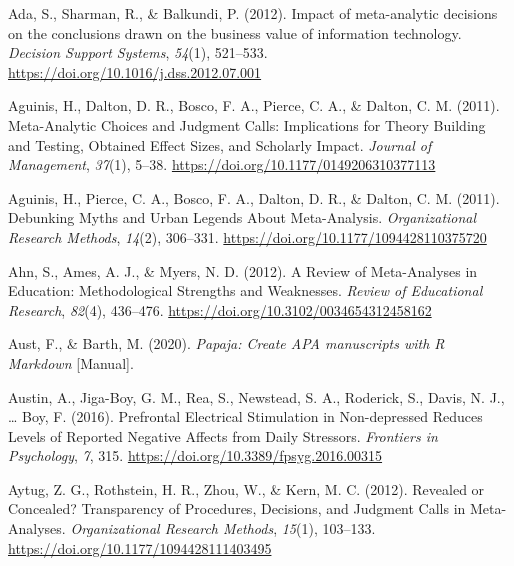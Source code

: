 \documentclass[
  man,floatsintext]{apa6}
\newlength{\cslhangindent}
\newlength{\cslentryspacingunit} %
\newenvironment{CSLReferences}[2] %
 {%
  \setlength{\parindent}{0pt}
  \ifodd #1
  \let\oldpar\par
  \def\par{\hangindent=\cslhangindent\oldpar}
  \fi
  \setlength{\parskip}{#2\cslentryspacingunit}
 }%
 {}
\begin{document}
\hypertarget{refs}{}
\begin{CSLReferences}{1}{0}
\leavevmode{}%
Ada, S., Sharman, R., \& Balkundi, P. (2012). Impact of meta-analytic decisions on the conclusions drawn on the business value of information technology. \emph{Decision Support Systems}, \emph{54}(1), 521--533. \url{https://doi.org/10.1016/j.dss.2012.07.001}

\leavevmode{}%
Aguinis, H., Dalton, D. R., Bosco, F. A., Pierce, C. A., \& Dalton, C. M. (2011). Meta-{Analytic Choices} and {Judgment Calls}: {Implications} for {Theory Building} and {Testing}, {Obtained Effect Sizes}, and {Scholarly Impact}. \emph{Journal of Management}, \emph{37}(1), 5--38. \url{https://doi.org/10.1177/0149206310377113}

\leavevmode{}%
Aguinis, H., Pierce, C. A., Bosco, F. A., Dalton, D. R., \& Dalton, C. M. (2011). Debunking {Myths} and {Urban Legends About Meta-Analysis}. \emph{Organizational Research Methods}, \emph{14}(2), 306--331. \url{https://doi.org/10.1177/1094428110375720}

\leavevmode{}%
Ahn, S., Ames, A. J., \& Myers, N. D. (2012). A {Review} of {Meta-Analyses} in {Education}: {Methodological Strengths} and {Weaknesses}. \emph{Review of Educational Research}, \emph{82}(4), 436--476. \url{https://doi.org/10.3102/0034654312458162}

\leavevmode{}%
Aust, F., \& Barth, M. (2020). \emph{Papaja: {Create APA} manuscripts with {R Markdown}} {[}Manual{]}.

\leavevmode{}%
Austin, A., Jiga-Boy, G. M., Rea, S., Newstead, S. A., Roderick, S., Davis, N. J., \ldots{} Boy, F. (2016). Prefrontal {Electrical Stimulation} in {Non-depressed Reduces Levels} of {Reported Negative Affects} from {Daily Stressors}. \emph{Frontiers in Psychology}, \emph{7}, 315. \url{https://doi.org/10.3389/fpsyg.2016.00315}

\leavevmode{}%
Aytug, Z. G., Rothstein, H. R., Zhou, W., \& Kern, M. C. (2012). Revealed or {Concealed}? {Transparency} of {Procedures}, {Decisions}, and {Judgment Calls} in {Meta-Analyses}. \emph{Organizational Research Methods}, \emph{15}(1), 103--133. \url{https://doi.org/10.1177/1094428111403495}


\end{CSLReferences}
\end{document}
